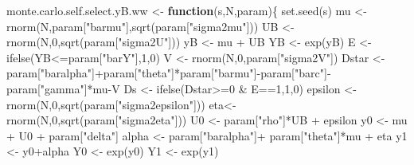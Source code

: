 \documentclass[
]{book}
\newenvironment{Shaded}{\begin{snugshade}}{\end{snugshade}}
\newcommand{\ControlFlowTok}[1]{\textcolor[rgb]{0.13,0.29,0.53}{\textbf{#1}}}
\newcommand{\DecValTok}[1]{\textcolor[rgb]{0.00,0.00,0.81}{#1}}
\newcommand{\FunctionTok}[1]{\textcolor[rgb]{0.00,0.00,0.00}{#1}}
\newcommand{\NormalTok}[1]{#1}
\newcommand{\OtherTok}[1]{\textcolor[rgb]{0.56,0.35,0.01}{#1}}
\newcommand{\SpecialCharTok}[1]{\textcolor[rgb]{0.00,0.00,0.00}{#1}}
\newcommand{\StringTok}[1]{\textcolor[rgb]{0.31,0.60,0.02}{#1}}
\theoremstyle{definition}
\theoremstyle{definition}
\theoremstyle{definition}
\theoremstyle{definition}
\theoremstyle{remark}
\begin{document}
\begin{Shaded}
\begin{Highlighting}[]
\NormalTok{monte.carlo.self.select.yB.ww }\OtherTok{\textless{}{-}} \ControlFlowTok{function}\NormalTok{(s,N,param)\{}
  \FunctionTok{set.seed}\NormalTok{(s)}
\NormalTok{  mu }\OtherTok{\textless{}{-}} \FunctionTok{rnorm}\NormalTok{(N,param[}\StringTok{"barmu"}\NormalTok{],}\FunctionTok{sqrt}\NormalTok{(param[}\StringTok{"sigma2mu"}\NormalTok{]))}
\NormalTok{  UB }\OtherTok{\textless{}{-}} \FunctionTok{rnorm}\NormalTok{(N,}\DecValTok{0}\NormalTok{,}\FunctionTok{sqrt}\NormalTok{(param[}\StringTok{"sigma2U"}\NormalTok{]))}
\NormalTok{  yB }\OtherTok{\textless{}{-}}\NormalTok{ mu }\SpecialCharTok{+}\NormalTok{ UB }
\NormalTok{  YB }\OtherTok{\textless{}{-}} \FunctionTok{exp}\NormalTok{(yB)}
\NormalTok{  E }\OtherTok{\textless{}{-}} \FunctionTok{ifelse}\NormalTok{(YB}\SpecialCharTok{\textless{}=}\NormalTok{param[}\StringTok{"barY"}\NormalTok{],}\DecValTok{1}\NormalTok{,}\DecValTok{0}\NormalTok{)}
\NormalTok{  V }\OtherTok{\textless{}{-}} \FunctionTok{rnorm}\NormalTok{(N,}\DecValTok{0}\NormalTok{,param[}\StringTok{"sigma2V"}\NormalTok{])}
\NormalTok{  Dstar }\OtherTok{\textless{}{-}}\NormalTok{ param[}\StringTok{"baralpha"}\NormalTok{]}\SpecialCharTok{+}\NormalTok{param[}\StringTok{"theta"}\NormalTok{]}\SpecialCharTok{*}\NormalTok{param[}\StringTok{"barmu"}\NormalTok{]}\SpecialCharTok{{-}}\NormalTok{param[}\StringTok{"barc"}\NormalTok{]}\SpecialCharTok{{-}}\NormalTok{param[}\StringTok{"gamma"}\NormalTok{]}\SpecialCharTok{*}\NormalTok{mu}\SpecialCharTok{{-}}\NormalTok{V}
\NormalTok{  Ds }\OtherTok{\textless{}{-}} \FunctionTok{ifelse}\NormalTok{(Dstar}\SpecialCharTok{\textgreater{}=}\DecValTok{0} \SpecialCharTok{\&}\NormalTok{ E}\SpecialCharTok{==}\DecValTok{1}\NormalTok{,}\DecValTok{1}\NormalTok{,}\DecValTok{0}\NormalTok{)}
\NormalTok{  epsilon }\OtherTok{\textless{}{-}} \FunctionTok{rnorm}\NormalTok{(N,}\DecValTok{0}\NormalTok{,}\FunctionTok{sqrt}\NormalTok{(param[}\StringTok{"sigma2epsilon"}\NormalTok{]))}
\NormalTok{  eta}\OtherTok{\textless{}{-}} \FunctionTok{rnorm}\NormalTok{(N,}\DecValTok{0}\NormalTok{,}\FunctionTok{sqrt}\NormalTok{(param[}\StringTok{"sigma2eta"}\NormalTok{]))}
\NormalTok{  U0 }\OtherTok{\textless{}{-}}\NormalTok{ param[}\StringTok{"rho"}\NormalTok{]}\SpecialCharTok{*}\NormalTok{UB }\SpecialCharTok{+}\NormalTok{ epsilon}
\NormalTok{  y0 }\OtherTok{\textless{}{-}}\NormalTok{ mu }\SpecialCharTok{+}\NormalTok{  U0 }\SpecialCharTok{+}\NormalTok{ param[}\StringTok{"delta"}\NormalTok{]}
\NormalTok{  alpha }\OtherTok{\textless{}{-}}\NormalTok{ param[}\StringTok{"baralpha"}\NormalTok{]}\SpecialCharTok{+}\NormalTok{  param[}\StringTok{"theta"}\NormalTok{]}\SpecialCharTok{*}\NormalTok{mu }\SpecialCharTok{+}\NormalTok{ eta}
\NormalTok{  y1 }\OtherTok{\textless{}{-}}\NormalTok{ y0}\SpecialCharTok{+}\NormalTok{alpha}
\NormalTok{  Y0 }\OtherTok{\textless{}{-}} \FunctionTok{exp}\NormalTok{(y0)}
\NormalTok{  Y1 }\OtherTok{\textless{}{-}} \FunctionTok{exp}\NormalTok{(y1)}
  

\end{Highlighting}
\end{Shaded}
\end{document}
